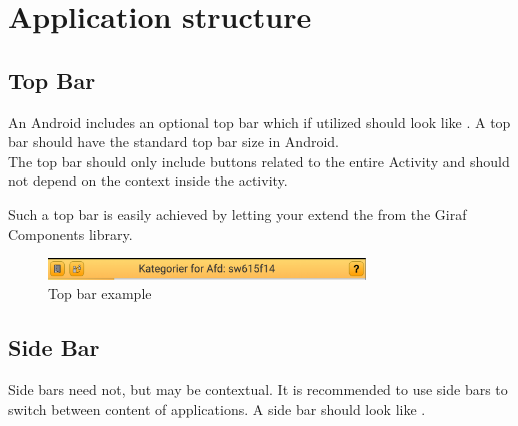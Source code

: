 
\chapter{Application structure}

\section{Top Bar}
An Android  includes an optional top bar which if utilized should look like . A top bar should have the standard top bar size in Android.\\
The top bar should only include buttons related to the entire Activity and should not depend on the context inside the activity.

\begin{note}
Such a top bar is easily achieved by letting your  extend the  from the Giraf Components library.
\end{note}

\begin{figure}[!htbp]
        \centering
        \includegraphics[width=0.75\textwidth]{pictures/application_structure/topbar}
        \caption{Top bar example}
        \label{fig:top_bar_example}
\end{figure}

\FloatBarrier


\section{Side Bar}

Side bars need not, but may be contextual. It is recommended to use side bars to switch between content of applications. A side bar should look like .

